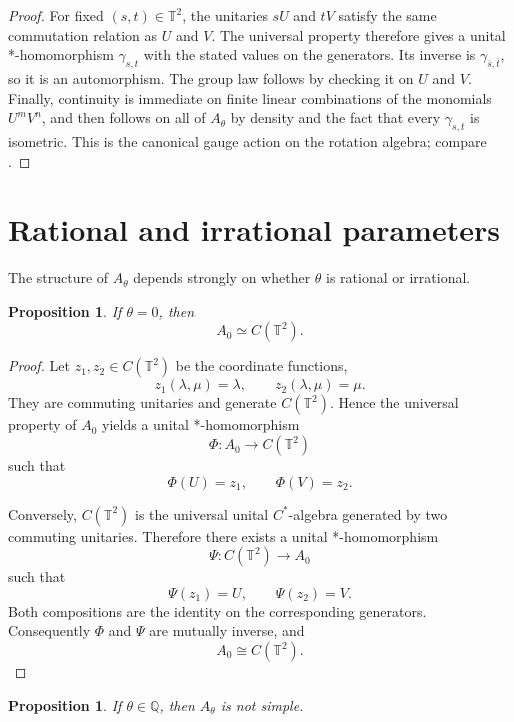 \documentclass{book}
\newtheorem{proposition}[definition]{Proposition}
\begin{document}
\begin{proof}
For fixed \((s,t)\in\mathbb T^2\), the unitaries \(sU\) and \(tV\)
satisfy the same commutation relation as \(U\) and \(V\). The universal
property therefore gives a unital *-homomorphism \(\gamma_{s,t}\) with the
stated values on the generators. Its inverse is
\(\gamma_{\overline{s},\overline{t}}\), so it is an automorphism. The group
law follows by checking it on \(U\) and \(V\). Finally, continuity is
immediate on finite linear combinations of the monomials \(U^mV^n\), and
then follows on all of \(A_\theta\) by density and the fact that every
\(\gamma_{s,t}\) is isometric. This is the canonical gauge action on the
rotation algebra; compare \cite[Chapter~VI, Section~1]{Davidson1996}.
\end{proof}











\section{Rational and irrational parameters}

The structure of \(A_\theta\) depends strongly on whether
\(\theta\) is rational or irrational.

\begin{proposition}
If \(\theta=0\), then
\[
A_0\simeq C(\mathbb T^2).
\]
\end{proposition}

\begin{proof}
Let \(z_1,z_2\in C(\mathbb T^2)\) be the coordinate functions,
\[
z_1(\lambda,\mu)=\lambda,
\qquad
z_2(\lambda,\mu)=\mu.
\]
They are commuting unitaries and generate \(C(\mathbb T^2)\).
Hence the universal property of \(A_0\) yields a unital
*-homomorphism
\[
\Phi:A_0\longrightarrow C(\mathbb T^2)
\]
such that
\[
\Phi(U)=z_1,\qquad \Phi(V)=z_2.
\]

Conversely, \(C(\mathbb T^2)\) is the universal unital
\(C^*\)-algebra generated by two commuting unitaries. Therefore
there exists a unital *-homomorphism
\[
\Psi:C(\mathbb T^2)\longrightarrow A_0
\]
such that
\[
\Psi(z_1)=U,\qquad \Psi(z_2)=V.
\]
Both compositions are the identity on the corresponding generators.
Consequently \(\Phi\) and \(\Psi\) are mutually inverse, and
\[
A_0\cong C(\mathbb T^2).
\]
\end{proof}

\begin{proposition}\label{prop:rationalTheta}
If \(\theta\in\mathbb Q\), then \(A_\theta\) is not simple.
\end{proposition}
\end{document}
